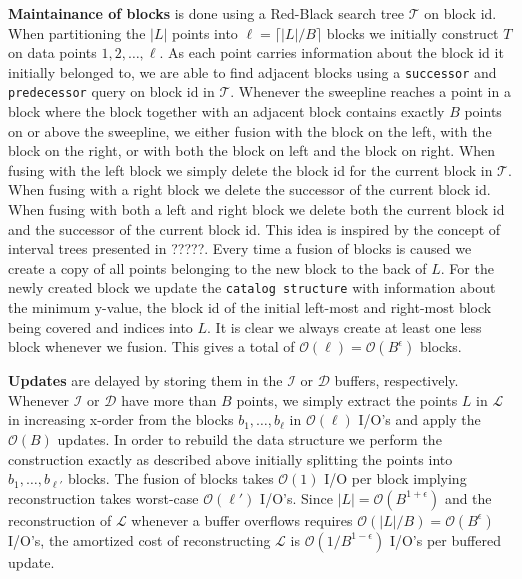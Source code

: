 \documentclass[twoside,11pt,openright]{report}
\begin{document}
\textbf{Maintainance of blocks} is done using a Red-Black search tree $\mathcal{T}$ on block id. When partitioning the $\vert L \vert$ points into $\ell = \lceil\lvert L \lvert / B\rceil$ blocks we initially construct $T$ on data points $1, 2, \dots, \ell$. As each point carries information about the block id it initially belonged to, we are able to find adjacent blocks using a \texttt{successor} and \texttt{predecessor} query on block id in $\mathcal{T}$. Whenever the sweepline reaches a point in a block where the block together with an adjacent block contains exactly $B$ points on or above the sweepline, we either fusion with the block on the left, with the block on the right, or with both the block on left and the block on right. When fusing with the left block we simply delete the block id for the current block in $\mathcal{T}$. When fusing with a right block we delete the successor of the current block id. When fusing with both a left and right block we delete both the current block id and the successor of the current block id. This idea is inspired by the concept of interval trees presented in ?????. %
Every time a fusion of blocks is caused we create a copy of all points belonging to the new block to the back of $L$. For the newly created block we update the \texttt{catalog structure} with information about the minimum y-value, the block id of the initial left-most and right-most block being covered and indices into $L$.
It is clear we always create at least one less block whenever we fusion. This gives a total of $\mathcal{O}(\ell) = \mathcal{O}(B^{\epsilon})$ blocks.

\textbf{Updates} are delayed by storing them in the $\mathcal{I}$ or $\mathcal{D}$ buffers, respectively. Whenever $\mathcal{I}$ or $\mathcal{D}$ have more than $B$ points, we simply extract the points $L$ in $\mathcal{L}$ in increasing x-order from the blocks $b_1, \dots, b_{\ell}$ in $\mathcal{O}(\ell)$ I/O's and apply the $\mathcal{O}(B)$ updates. In order to rebuild the data structure we perform the construction exactly as described above initially splitting the points into $b_1, \dots, b_{\ell'}$ blocks. The fusion of blocks takes $\mathcal{O}(1)$ I/O per block implying reconstruction takes worst-case $\mathcal{O}(\ell')$ I/O's. Since $\lvert L \lvert = \mathcal{O}(B^{1+\epsilon})$ and the reconstruction of $\mathcal{L}$ whenever a buffer overflows requires $\mathcal{O}(\lvert L \lvert / B) = \mathcal{O}(B^{\epsilon})$ I/O's, the amortized cost of reconstructing $\mathcal{L}$ is $\mathcal{O}(1/B^{1-\epsilon})$ I/O's per buffered update.
\end{document}
